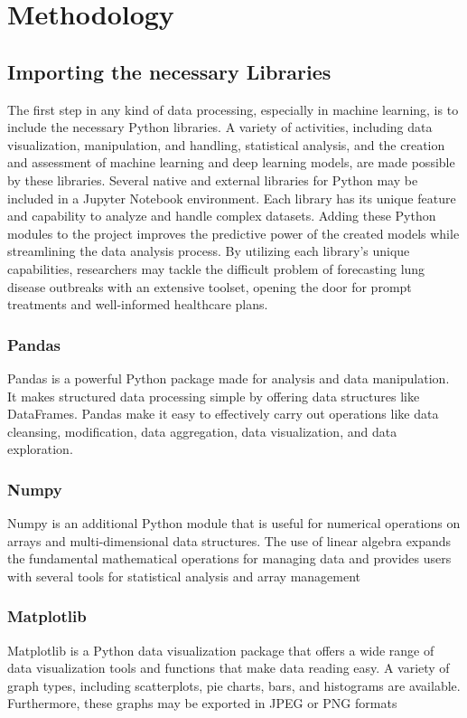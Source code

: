 \chapter{Methodology}
\label{ch:method} %

\section{Importing the necessary Libraries}
The first step in any kind of data processing, especially in machine learning, is to include the necessary Python libraries. A variety of activities, including data visualization, manipulation, and handling, statistical analysis, and the creation and assessment of machine learning and deep learning models, are made possible by these libraries. Several native and external libraries for Python may be included in a Jupyter Notebook environment. Each library has its unique feature and capability to analyze and handle complex datasets. Adding these Python modules to the project improves the predictive power of the created models while streamlining the data analysis process. By utilizing each library's unique capabilities, researchers may tackle the difficult problem of forecasting lung disease outbreaks with an extensive toolset, opening the door for prompt treatments and well-informed healthcare plans.
\subsection{Pandas}
\label{subsec:se_chpters}
Pandas is a powerful Python package made for analysis and data manipulation. It makes structured data processing simple by offering data structures like DataFrames. Pandas make it easy
to effectively carry out operations like data cleansing, modification, data aggregation, data visualization, and data exploration.

\subsection{Numpy}
Numpy is an additional Python module that is useful for numerical operations on arrays and multi-dimensional data structures. The use of linear algebra expands the fundamental mathematical operations for managing data and provides users with several tools for statistical analysis and array management

\subsection{Matplotlib}
Matplotlib is a Python data visualization package that offers a wide range of data visualization
tools and functions that make data reading easy. A variety of graph types, including scatterplots,
pie charts, bars, and histograms are available. Furthermore, these graphs may be exported in
JPEG or PNG formats

